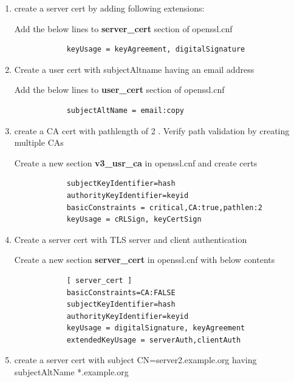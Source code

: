\documentclass[a4paper]{article}
\begin{document}
\begin{enumerate}[label*=\arabic*.]
        Add the below lines to \textbf{user\_cert} section of openssl.cnf
        \begin{lstlisting}
            keyUsage = nonRepudiation, digitalSignature
        \end{lstlisting}

    \item create a server cert by adding following extensions:

        Add the below  lines to \textbf{server\_cert} section of openssl.cnf
        \begin{lstlisting}
            keyUsage = keyAgreement, digitalSignature
        \end{lstlisting}
    
    \item Create a user cert with subjectAltname having an email address

        Add the below lines to \textbf{user\_cert} section of openssl.cnf
        \begin{lstlisting}
            subjectAltName = email:copy
        \end{lstlisting}

    \item create a CA cert with pathlength of 2 . Verify path validation by creating multiple CAs

        Create a new section \textbf{v3\_usr\_ca} in openssl.cnf and create certs
        \begin{lstlisting}
            subjectKeyIdentifier=hash
            authorityKeyIdentifier=keyid
            basicConstraints = critical,CA:true,pathlen:2
            keyUsage = cRLSign, keyCertSign
        \end{lstlisting}
    
    \item Create a server cert with TLS server and client authentication

        Create a new section \textbf{server\_cert} in openssl.cnf with below contents
        \begin{lstlisting}
            [ server_cert ]
            basicConstraints=CA:FALSE
            subjectKeyIdentifier=hash
            authorityKeyIdentifier=keyid
            keyUsage = digitalSignature, keyAgreement
            extendedKeyUsage = serverAuth,clientAuth
        \end{lstlisting}

    \item create a server cert with subject CN=server2.example.org having subjectAltName *.example.org
        

\end{enumerate}
\end{document}
